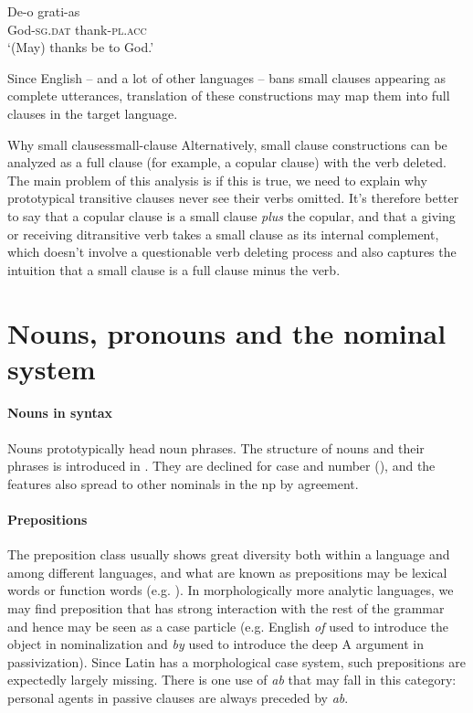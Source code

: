 \documentclass[a4paper, oneside, 12pt]{report}
\newcommand{\form}[1]{\emph{#1}}
\newcommand*{\category}[1]{\textsc{#1}}
\newcommand{\translate}[1]{`#1'}
\begin{document}
\begin{exe}
    \ex \gll De-o grati-as \\
    God-\category{sg}.\category{dat} thank-\category{pl}.\category{acc} \\
    \glt \translate{(May) thanks be to God.}
    \label{ex:clause.small-clause.1}
\end{exe}

Since English -- and a lot of other languages -- 
bans small clauses appearing as complete utterances,
translation of these constructions may map them into full clauses in the target language. 

\begin{infobox}{Why small clauses}{small-clause}
    Alternatively, small clause constructions can be analyzed 
    as a full clause (for example, a copular clause) with the verb deleted.
    The main problem of this analysis is if this is true, 
    we need to explain why prototypical transitive clauses 
    never see their verbs omitted.
    It's therefore better to say 
    that a copular clause is a small clause \emph{plus} the copular,
    and that a giving or receiving ditransitive verb 
    takes a small clause as its internal complement,
    which doesn't involve a questionable verb deleting process
    and also captures the intuition that 
    a small clause is a full clause minus the verb.
\end{infobox}



\section{Nouns, pronouns and the nominal system}

\paragraph*{Nouns in syntax}
Nouns prototypically head noun phrases.
The structure of nouns and their phrases is introduced in .
They are declined for case and number (),
and the features also spread to other nominals in the \acs{np} by agreement.

\paragraph*{Prepositions} The preposition class usually shows great diversity  
both within a language and among different languages,
and what are known as prepositions may be lexical words or function words 
(e.g. \citealt{garzonio2021functional}).
In morphologically more analytic languages, 
we may find preposition that has strong interaction with the rest of the grammar 
and hence may be seen as a case particle 
(e.g. English \form{of} used to introduce the object in nominalization 
and \form{by} used to introduce the deep A argument in passivization).
Since Latin has a morphological case system, 
such prepositions are expectedly largely missing.
There is one use of \form{ab} that may fall in this category:
personal agents in passive clauses are always 
preceded by \form{ab}.
\end{document}
